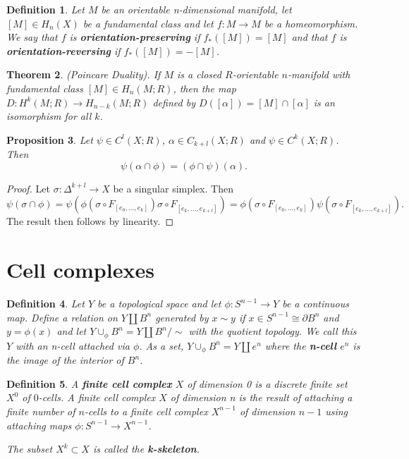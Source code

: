 \documentclass{article}
\newtheorem{theorem}{Theorem}[section]
\newtheorem{definition}[theorem]{Definition}
\newtheorem{proposition}[theorem]{Proposition}
\begin{document}
\begin{definition}
Let $M$ be an orientable n-dimensional manifold, let $[M]\in H_n(X)$ be a fundamental class and let $f\colon M\to M$ be a homeomorphism. We say that $f$ is \textbf{orientation-preserving} if $f_*([M])=[M]$ and that $f$ is \textbf{orientation-reversing} if $f_*([M])=-[M]$.
\end{definition}




\begin{theorem}
(Poincare Duality). If $M$ is a closed $R$-orientable $n$-manifold with fundamental class $[M]\in H_n(M;R)$, then the map $D\colon H^k(M;R)\to H_{n-k}(M;R)$ defined by $D([\alpha])=[M]\cap[\alpha]$ is an isomorphism for all $k$.
\end{theorem}

\begin{proposition}
Let $\psi\in C^l(X;R)$, $\alpha\in C_{k+l}(X;R)$ and $\psi\in C^k(X;R)$. Then \[\psi(\alpha\cap\phi)=(\phi\cap\psi)(\alpha).\]
\end{proposition}
\begin{proof}
Let $\sigma\colon\Delta^{k+l}\to X$ be a singular simplex. Then \[\psi(\sigma\cap\phi)=\psi(\phi(\sigma\circ F_{[e_0,...,e_k]})\sigma\circ F_{[e_k,...,e_{k+l}]})=\phi(\sigma\circ F_{[e_0,...,e_k]})\psi(\sigma\circ F_{[e_k,...,e_{k+l}]}).\]
The result then follows by linearity.
\end{proof}

\section{Cell complexes}
\begin{definition}
Let $Y$ be a topological space and let $\phi\colon S^{n-1}\to Y$ be a continuous map. Define a relation on $Y\coprod B^n$ generated by $x\sim y$ if $x\in S^{n-1}\cong\partial B^n$ and $y=\phi(x)$ and let $Y\cup_\phi B^n=Y\coprod B^n/\sim$ with the quotient topology. We call this $Y$ with an n-cell attached via $\phi$.
\noindent As a set, $Y\cup_\phi B^n=Y\coprod e^n$ where the \textbf{n-cell} $e^n$ is the image of the interior of $B^n$.
\end{definition}

\begin{definition}
A \textbf{finite cell complex} $X$ of dimension 0 is a discrete finite set $X^0$ of $0$-cells. A finite cell complex $X$ of dimension n is the result of attaching a finite number of $n$-cells to a finite cell complex $X^{n-1}$ of dimension $n-1$ using attaching maps $\phi\colon S^{n-1}\to X^{n-1}$.

\noindent The subset $X^k\subset X$ is called the \textbf{k-skeleton}.
\end{definition}
\end{document}
